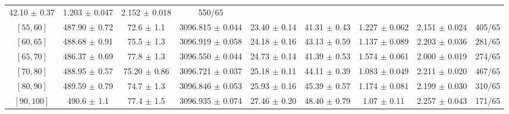 \begin{tabular}{c||c|c|c|c|c|c|c||c}
42.10 $\pm$ 0.37 & 
1.203 $\pm$ 0.047 & 
2.152 $\pm$ 0.018 & 
550/65\\
$[55, 60]$ & 487.90 $\pm$ 0.72 & 
72.6 $\pm$ 1.1 & 
3096.815 $\pm$ 0.044 & 
23.40 $\pm$ 0.14 & 
41.31 $\pm$ 0.43 & 
1.227 $\pm$ 0.062 & 
2.151 $\pm$ 0.024 & 
405/65\\
$[60, 65]$ & 488.68 $\pm$ 0.91 & 
75.5 $\pm$ 1.3 & 
3096.919 $\pm$ 0.058 & 
24.18 $\pm$ 0.16 & 
43.13 $\pm$ 0.59 & 
1.137 $\pm$ 0.089 & 
2.203 $\pm$ 0.036 & 
281/65\\
$[65, 70]$ & 486.37 $\pm$ 0.69 & 
77.8 $\pm$ 1.3 & 
3096.550 $\pm$ 0.044 & 
24.73 $\pm$ 0.14 & 
41.39 $\pm$ 0.53 & 
1.574 $\pm$ 0.061 & 
2.000 $\pm$ 0.019 & 
274/65\\
$[70, 80]$ & 488.95 $\pm$ 0.57 & 
75.20 $\pm$ 0.86 & 
3096.721 $\pm$ 0.037 & 
25.18 $\pm$ 0.11 & 
44.11 $\pm$ 0.39 & 
1.083 $\pm$ 0.049 & 
2.211 $\pm$ 0.020 & 
467/65\\
$[80, 90]$ & 489.59 $\pm$ 0.79 & 
74.7 $\pm$ 1.3 & 
3096.846 $\pm$ 0.053 & 
25.93 $\pm$ 0.16 & 
45.39 $\pm$ 0.57 & 
1.174 $\pm$ 0.081 & 
2.199 $\pm$ 0.030 & 
310/65\\
$[90, 100]$ & 490.6 $\pm$ 1.1 & 
77.4 $\pm$ 1.5 & 
3096.935 $\pm$ 0.074 & 
27.46 $\pm$ 0.20 & 
48.40 $\pm$ 0.79 & 
1.07 $\pm$ 0.11 & 
2.257 $\pm$ 0.043 & 
171/65\\
\end{tabular}
